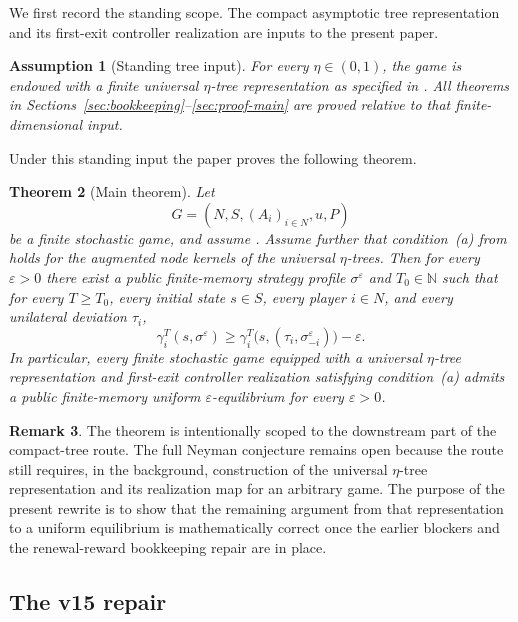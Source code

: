 \documentclass[12pt]{article}
\newtheorem{theorem}{Theorem}[section]
\newtheorem{assumption}[theorem]{Assumption}
\theoremstyle{definition}
\newtheorem{remark}[theorem]{Remark}
\newcommand{\eps}{\varepsilon}
\newcommand{\N}{\mathbb{N}}
\newcommand{\1}{\mathbf{1}}
\begin{document}
We first record the standing scope. The compact asymptotic tree representation and
its first-exit controller realization are inputs to the present paper.

\begin{assumption}[Standing tree input]
\label{ass:tree-input}
For every $\eta\in(0,1)$, the game is endowed with a finite universal
$\eta$-tree representation as specified in
. All theorems in
Sections~\ref{sec:bookkeeping}--\ref{sec:proof-main} are proved relative to that
finite-dimensional input.
\end{assumption}

Under this standing input the paper proves the following theorem.

\begin{theorem}[Main theorem]
\label{thm:main}
Let
\[
G=(N,S,(A_i)_{i\in N},u,P)
\]
be a finite stochastic game, and assume . Assume further
that condition~\textnormal{(a)} from  holds for the augmented node
kernels of the universal $\eta$-trees. Then for every $\eps>0$ there exist a
public finite-memory strategy profile $\sigma^\eps$ and $T_0\in\N$ such that for
every $T\ge T_0$, every initial state $s\in S$, every player $i\in N$, and every
unilateral deviation $\tau_i$,
\[
\gamma_i^T(s,\sigma^\eps)
\ge
\gamma_i^T\bigl(s,(\tau_i,\sigma^\eps_{-i})\bigr)-\eps.
\]
In particular, every finite stochastic game equipped with a universal
$\eta$-tree representation and first-exit controller realization satisfying
condition~\textnormal{(a)} admits a public finite-memory uniform
$\eps$-equilibrium for every $\eps>0$.
\end{theorem}

\begin{remark}
The theorem is intentionally scoped to the downstream part of the compact-tree
route. The full Neyman conjecture remains open because the route still requires,
in the background, construction of the universal $\eta$-tree representation and
its realization map for an arbitrary game. The purpose of the present rewrite is
to show that the remaining argument from that representation to a uniform
equilibrium is mathematically correct once the earlier blockers and the
renewal-reward bookkeeping repair are in place.
\end{remark}



\subsection{The v15 repair}
\end{document}
